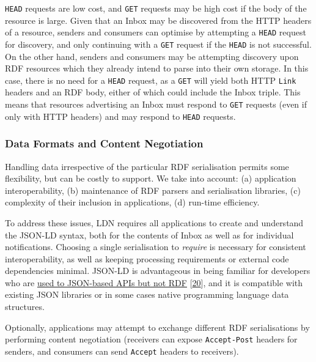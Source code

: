 \documentclass[]{article}
\begin{document}
{{\texttt{HEAD} requests are low cost, and \texttt{GET} requests may be
high cost if the body of the resource is large.}} {{Given that an Inbox
may be discovered from the HTTP headers of a resource, senders and
consumers can optimise by attempting a \texttt{HEAD} request for
discovery, and only continuing with a \texttt{GET} request if the
\texttt{HEAD} is not successful. On the other hand, senders and
consumers may be attempting discovery upon RDF resources which they
already intend to parse into their own storage. In this case, there is
no need for a \texttt{HEAD} request, as a \texttt{GET} will yield both
HTTP \texttt{Link} headers and an RDF body, either of which could
include the Inbox triple. This means that resources advertising an Inbox
must respond to \texttt{GET} requests (even if only with HTTP headers)
and may respond to \texttt{HEAD} requests.}}

\hypertarget{data-formats}{}
\subsubsection{Data Formats and Content
Negotiation}\label{data-formats-and-content-negotiation}

{Handling data irrespective of the particular RDF serialisation permits
some flexibility, but can be costly to support. We take into account:
(a) application interoperability, (b) maintenance of RDF parsers and
serialisation libraries, (c) complexity of their inclusion in
applications, (d) run-time efficiency.}

{{To address these issues, LDN requires all applications to create and
understand the JSON-LD syntax, both for the contents of Inbox as well as
for individual notifications. Choosing a single serialisation to
\emph{require} is necessary for consistent interoperability, as well as
keeping processing requirements or external code dependencies minimal.}}
{{JSON-LD is advantageous in being familiar for developers who are
\href{http://manu.sporny.org/2014/json-ld-origins-2/}{used to JSON-based
APIs but not RDF} {[}\protect\hyperlink{ref-20}{20}{]}, and it is
compatible with existing JSON libraries or in some cases native
programming language data structures.}}

Optionally, {{applications may attempt to exchange different RDF
serialisations by performing content negotiation}} ({{receivers can
expose \texttt{Accept-Post} headers for senders, and consumers can send
\texttt{Accept} headers to receivers}}).

\hypertarget{precision}{}
\end{document}
